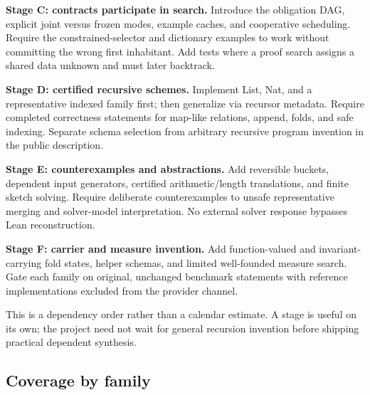 \documentclass[11pt,letterpaper]{article}
\theoremstyle{definition}\newtheorem{definition}[theorem]{Definition}
\theoremstyle{remark}\newtheorem{remark}[theorem]{Remark}
\begin{document}
\textbf{Stage C: contracts participate in search.} Introduce the obligation DAG,
explicit joint versus frozen modes, example caches, and cooperative scheduling.
Require the constrained-selector and dictionary examples to work without
committing the wrong first inhabitant. Add tests where a proof search assigns a
shared data unknown and must later backtrack.

\textbf{Stage D: certified recursive schemes.} Implement List, Nat, and a
representative indexed family first; then generalize via recursor metadata.
Require completed correctness statements for map-like relations, append,
folds, and safe indexing. Separate schema selection from arbitrary recursive
program invention in the public description.

\textbf{Stage E: counterexamples and abstractions.} Add reversible buckets,
dependent input generators, certified arithmetic/length translations, and finite
sketch solving. Require deliberate counterexamples to unsafe representative
merging and solver-model interpretation. No external solver response bypasses
Lean reconstruction.

\textbf{Stage F: carrier and measure invention.} Add function-valued and
invariant-carrying fold states, helper schemas, and limited well-founded measure
search. Gate each family on original, unchanged benchmark statements with
reference implementations excluded from the provider channel.

This is a dependency order rather than a calendar estimate. A stage is useful
on its own; the project need not wait for general recursion invention before
shipping practical dependent synthesis.

\subsection{Coverage by family}
\end{document}
